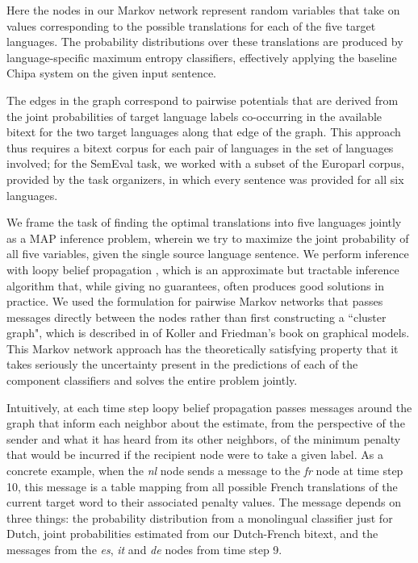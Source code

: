 Here the nodes in our Markov network represent random variables that take on
values corresponding to the possible translations for each of the five target
languages. The probability distributions over these translations are produced
by language-specific maximum entropy classifiers, effectively applying the
baseline Chipa system on the given input sentence.

The edges in the graph correspond to pairwise potentials that are derived from
the joint probabilities of target language labels co-occurring in the available
bitext for the two target languages along that edge of the graph. This approach
thus requires a bitext corpus for each pair of languages in the set of
languages involved; for the SemEval task, we worked with a subset of the
Europarl corpus, provided by the task organizers, in which every sentence was
provided for all six languages.

We frame the task of finding the optimal translations into five languages
jointly as a MAP inference problem, wherein we try to maximize the joint
probability of all five variables, given the single source language sentence.
We perform inference with loopy belief propagation
\cite{DBLP:conf/uai/MurphyWJ99}, which is an approximate but tractable
inference algorithm that, while giving no guarantees, often produces good
solutions in practice.
We used the formulation for pairwise Markov networks that passes messages
directly between the nodes rather than first constructing a ``cluster graph",
which is described in \cite[\S 11.3.5.1]{Koller+Friedman:09} of Koller and
Friedman's book on graphical models. This Markov network approach has the
theoretically satisfying property that it takes seriously the uncertainty
present in the predictions of each of the component classifiers and solves the
entire problem jointly. 

Intuitively, at each time step loopy belief propagation passes messages around
the graph that inform each neighbor about the estimate, from the perspective of
the sender and what it has heard from its other neighbors, of the minimum
penalty that would be incurred if the recipient node were to take a given
label. As a concrete example, when the \emph{nl} node sends a message to the
\emph{fr} node at time step 10, this message is a table mapping from all
possible French translations of the current target word to their associated
penalty values. The message depends on three things: the probability
distribution from a monolingual classifier just for Dutch, joint probabilities
estimated from our Dutch-French bitext, and the messages from the \emph{es},
\emph{it} and \emph{de} nodes from time step 9.

